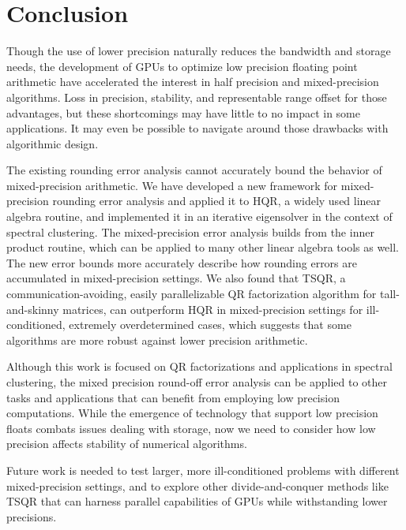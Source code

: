 \documentclass[review,onefignum,onetabnum]{siamart190516}
\begin{document}
\section{Conclusion}
Though the use of lower precision naturally reduces the bandwidth and storage needs, the development of GPUs to optimize low precision floating point arithmetic have accelerated the interest in half precision and mixed-precision algorithms. 
Loss in precision, stability, and representable range offset for those advantages, but these shortcomings may have little to no impact in some applications.
It may even be possible to navigate around those drawbacks with algorithmic design. \par 

The existing rounding error analysis cannot accurately bound the behavior of mixed-precision arithmetic.
We have developed a new framework for mixed-precision rounding error analysis and applied it to HQR, a widely used linear algebra routine, and implemented it in an iterative eigensolver in the context of spectral clustering. 
The mixed-precision error analysis builds from the inner product routine, which can be applied to many other linear algebra tools as well.
The new error bounds more accurately describe how rounding errors are accumulated in mixed-precision settings.
We also found that TSQR, a communication-avoiding, easily parallelizable QR factorization algorithm for tall-and-skinny matrices, can outperform HQR in mixed-precision settings for ill-conditioned, extremely overdetermined cases, which suggests that some algorithms are more robust against lower precision arithmetic.

Although this work is focused on QR factorizations and applications in spectral clustering, the mixed precision round-off error analysis can be applied to other tasks and applications that can benefit from employing low precision computations. 
While the emergence of technology that support low precision floats combats issues dealing with storage, now we need to consider how low precision affects stability of numerical algorithms. 

Future work is needed to test larger, more ill-conditioned problems with different mixed-precision settings, and to explore other divide-and-conquer methods like TSQR that can harness parallel capabilities of GPUs while withstanding lower precisions. 

%
%

\end{document}
